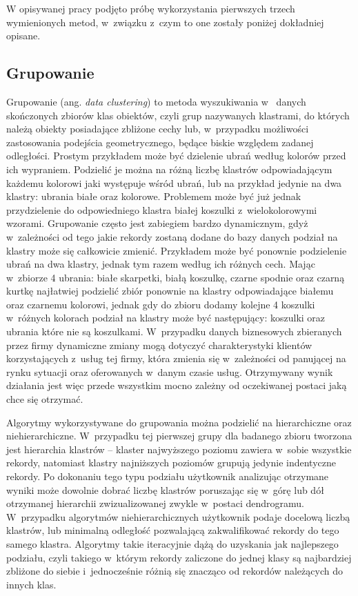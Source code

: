 \documentclass[a4paper,twoside,12pt]{book}
\newcommand{\obcy}[1]{\emph{#1}}
\renewcommand{\ang}[1]{{\selectlanguage{british}\obcy{#1}}}
\begin{document}
W opisywanej pracy podjęto próbę wykorzystania pierwszych trzech wymienionych metod, w~związku z~czym to one zostały poniżej dokładniej opisane.

\subsection{Grupowanie}
Grupowanie (ang. \ang{data clustering}) \cite{bib:clustering} to metoda wyszukiwania w~ danych skończonych zbiorów klas obiektów, czyli grup nazywanych klastrami, do których należą obiekty posiadające zbliżone cechy lub, w~przypadku możliwości zastosowania podejścia geometrycznego, będące biskie względem zadanej odległości. Prostym przykładem może być dzielenie ubrań według kolorów przed ich wypraniem. Podzielić je można na różną liczbę klastrów odpowiadającym każdemu kolorowi jaki występuje wśród ubrań, lub na przykład jedynie na dwa klastry: ubrania białe oraz kolorowe. Problemem może być już jednak przydzielenie do odpowiedniego klastra białej koszulki z~wielokolorowymi wzorami. Grupowanie często jest zabiegiem bardzo dynamicznym, gdyż w~zależności od tego jakie rekordy zostaną dodane do bazy danych podział na klastry może się całkowicie zmienić. Przykładem może być ponownie podzielenie ubrań na dwa klastry, jednak tym razem według ich różnych cech. Mając w~zbiorze 4 ubrania: białe skarpetki, białą koszulkę, czarne spodnie oraz czarną kurtkę najłatwiej podzielić zbiór ponownie na klastry odpowiadające białemu oraz czarnemu kolorowi, jednak gdy do zbioru dodamy kolejne 4 koszulki w~różnych kolorach podział na klastry może być następujący: koszulki oraz ubrania które nie są koszulkami. W~przypadku danych biznesowych zbieranych przez firmy dynamiczne zmiany mogą dotyczyć charakterystyki klientów korzystających z~usług tej firmy, która zmienia się w~zależności od panującej na rynku sytuacji oraz oferowanych w~danym czasie usług. Otrzymywany wynik działania jest więc przede wszystkim mocno zależny od oczekiwanej postaci jaką chce się otrzymać.

Algorytmy wykorzystywane do grupowania można podzielić na hierarchiczne oraz niehierarchiczne. W~przypadku tej pierwszej grupy dla badanego zbioru tworzona jest hierarchia klastrów -- klaster najwyższego poziomu zawiera w~sobie wszystkie rekordy, natomiast klastry najniższych poziomów grupują jedynie indentyczne rekordy. Po dokonaniu tego typu podziału użytkownik analizując otrzymane wyniki może dowolnie dobrać liczbę klastrów poruszając się w~górę lub dół otrzymanej hierarchii zwizualizowanej zwykle w~postaci dendrogramu. W~przypadku algorytmów niehierarchicznych użytkownik podaje docelową liczbą klastrów, lub minimalną odległość pozwalającą zakwalifikować rekordy do tego samego klastra. Algorytmy takie iteracyjnie dążą do uzyskania jak najlepszego podziału, czyli takiego w~którym rekordy zaliczone do jednej klasy są najbardziej zbliżone do siebie i~jednocześnie  różnią się znacząco od rekordów należących do innych klas.
\end{document}
